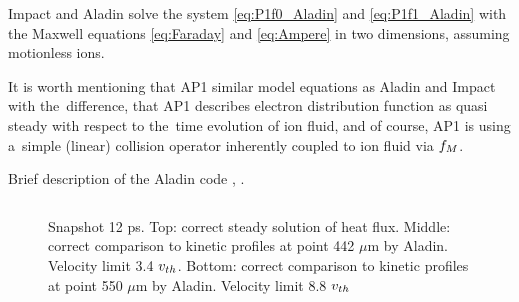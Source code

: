 %

Impact and Aladin solve the system \eqref{eq:P1f0_Aladin} 
and \eqref{eq:P1f1_Aladin} with the Maxwell equations  
\eqref{eq:Faraday} and \eqref{eq:Ampere} in two dimensions, 
assuming motionless ions.

It is worth mentioning that AP1  similar model equations as Aladin
and Impact with the~difference, that AP1 describes  electron distribution 
function as quasi steady with respect to the~time evolution of ion fluid,
and of course, AP1 is using a~simple (linear) collision operator inherently
coupled to ion fluid via $f_M$.

Brief description of the Aladin code , .




\begin{figure}[tbh]
  \begin{center}
    \begin{tabular}{c}
    \end{tabular}
  \caption{  
  Snapshot 12 ps. Top: correct steady solution of heat flux.  
  Middle: correct comparison to kinetic profiles at point 442 $\mu$m by Aladin. 
  Velocity limit 3.4 $v_{th}$.
  Bottom: correct comparison to kinetic profiles at point 550 $\mu$m by Aladin.
  Velocity limit 8.8 $v_{th}$
  }
  \label{fig:C7_Aladin_case3}
  \end{center} 
\end{figure}

